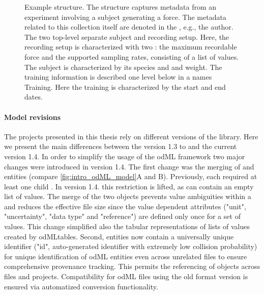 \begin{figure}
 \centering
 \scalebox{0.45}{
 }
 \caption[Example  structure]{Example  structure. The  structure captures metadata from an experiment involving a subject generating a force. The metadata related to this collection itself are denoted in the  , e.g., the author. The two top-level  separate subject and recording setup. Here, the recording setup is characterized with two : the maximum recordable force and the supported sampling rates, consisting of a list of values. The subject is characterized by its species and and weight. The training information is described one level below in a  names Training. Here the training is characterized by the start and end dates.}
 \label{fig:intro_example_odml_structure}
\end{figure}

\paragraph{Model revisions}
\label{sec:odml_model_revision}
The projects presented in this thesis rely on different versions of the  library. Here we present the main differences between the  version 1.3 to and the current  version 1.4.
In order to simplify the usage of the odML framework two major changes were introduced in  version 1.4. The first change was the merging of  and  entities (compare \ref{fig:intro_odML_model}A and B). Previously, each  required at least one child . In version 1.4. this restriction is lifted, as  can contain an empty list of values. The merge of the two objects prevents value ambiguities within a  and reduces the effective file size since the value dependent attributes ("unit", "uncertainty", "data type" and "reference") are defined only once for a set of values. This change simplified also the tabular representations of lists of values created by odMLtables. Second, entities now contain a universally unique identifier ("id", auto-generated identifier with extremely low collision probability) for unique identification of odML entities even across unrelated files to ensure comprehensive provenance tracking. This permits the referencing of  objects across files and projects. Compatibility for odML files using the old format version is ensured via automatized conversion functionality.


